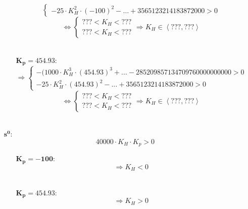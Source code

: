 \documentclass[a4paper,12pt]{article}
\begin{document}
\begin{itemize}
\begin{itemize}
\[\begin{cases}
                            -25 \cdot K_H^2 \cdot (-100)^2 - \dots + 3565123214183872000 > 0
                    \end{cases} \] \begin{equation}
                        \Leftrightarrow \begin{cases}
                        ??? < K_H < ??? \\
                        ??? < K_H < ???
                    \end{cases} \Rightarrow \boxed{K_H \in \left< ???, ??? \right>} \end{equation} \\
                \item[$\mathbf{K_p = 454.93 :}$] \[ \Rightarrow \begin{cases}
                            -(1000 \cdot K_H^3 \cdot (454.93)^3 + \dots - 285209857134709760000000000 > 0 \\
                            -25 \cdot K_H^2 \cdot (454.93)^2 - \dots + 3565123214183872000 > 0
                    \end{cases} \] \begin{equation}
                        \Leftrightarrow \begin{cases}
                        ??? < K_H < ??? \\
                        ??? < K_H < ???
                    \end{cases} \Rightarrow \boxed{K_H \in \left< ???, ??? \right>} \end{equation} \\
            \end{itemize}
        \item[$\mathbf{s^0 :}$] \[
                40000 \cdot K_H \cdot K_p > 0
            \] \begin{itemize}
                \item[$\mathbf{K_p = -100 :}$] \begin{equation} \Rightarrow \boxed{K_H < 0} \end{equation} \\
                \item[$\mathbf{K_p = 454.93 :}$] \begin{equation} \Rightarrow \boxed{K_H > 0} \end{equation} \\
            \end{itemize}
    \end{itemize}
\end{document}
